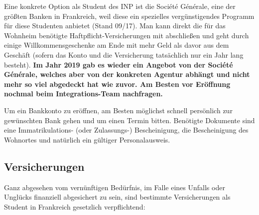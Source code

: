 \documentclass[11pt,a4paper]{article}
\newcommand{\change}[1]{{\bf #1}}
\begin{document}
  Eine konkrete Option als Student des INP ist die Société Générale, eine der größten Banken in Frankreich, weil diese ein spezielles vergünstigendes Programm für diese Studenten anbietet (Stand 09/17). Man kann direkt die für das Wohnheim benötigte Haftpflicht-Versicherungen mit abschließen und geht durch einige Willkommensgeschenke am Ende mit mehr Geld als davor aus dem Geschäft (sofern das Konto und die Versicherung tatsächlich nur ein Jahr lang besteht). \change{Im Jahr 2019 gab es wieder ein Angebot von der Société Générale, welches aber von der konkreten Agentur abhängt und nicht mehr so viel abgedeckt hat wie zuvor. Am Besten vor Eröffnung nochmal beim Integrations-Team nachfragen.}
	
	Um ein Bankkonto zu eröffnen, am Besten möglichst schnell persönlich zur gewünschten Bank gehen und um einen Termin bitten. Benötigte Dokumente sind eine Immatrikulations- (oder Zulassungs-) Bescheinigung, die Bescheinigung des Wohnortes und natürlich ein gültiger Personalausweis.
	
	\subsection{Versicherungen}
	
	Ganz abgesehen vom vernünftigen Bedürfnis, im Falle eines Unfalls oder Unglücks finanziell abgesichert zu sein, sind bestimmte Versicherungen als Student in Frankreich gesetzlich verpflichtend:
	
\end{document}
